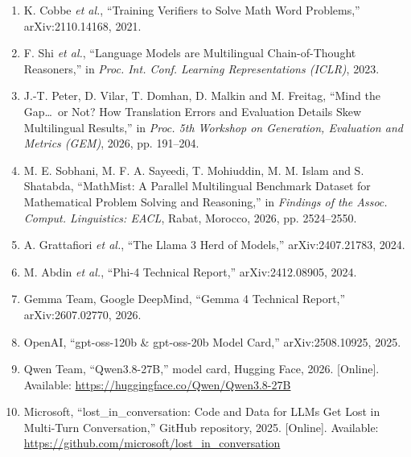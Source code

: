 \documentclass[11pt,a4paper]{article}
\begin{document}
\begin{enumerate}[label={\arabic*.},leftmargin=2em,itemsep=3pt,topsep=2pt]
\item K. Cobbe \textit{et al.}, ``Training Verifiers to Solve Math Word Problems,'' arXiv:2110.14168, 2021.
\item F. Shi \textit{et al.}, ``Language Models are Multilingual Chain-of-Thought Reasoners,'' in \textit{Proc. Int. Conf. Learning Representations (ICLR)}, 2023.
\item J.-T. Peter, D. Vilar, T. Domhan, D. Malkin and M. Freitag, ``Mind the Gap\ldots\ or Not? How Translation Errors and Evaluation Details Skew Multilingual Results,'' in \textit{Proc. 5th Workshop on Generation, Evaluation and Metrics (GEM)}, 2026, pp. 191--204.
\item M. E. Sobhani, M. F. A. Sayeedi, T. Mohiuddin, M. M. Islam and S. Shatabda, ``MathMist: A Parallel Multilingual Benchmark Dataset for Mathematical Problem Solving and Reasoning,'' in \textit{Findings of the Assoc. Comput. Linguistics: EACL}, Rabat, Morocco, 2026, pp. 2524--2550.
\item A. Grattafiori \textit{et al.}, ``The Llama 3 Herd of Models,'' arXiv:2407.21783, 2024.
\item M. Abdin \textit{et al.}, ``Phi-4 Technical Report,'' arXiv:2412.08905, 2024.
\item Gemma Team, Google DeepMind, ``Gemma 4 Technical Report,'' arXiv:2607.02770, 2026.
\item OpenAI, ``gpt-oss-120b \& gpt-oss-20b Model Card,'' arXiv:2508.10925, 2025.
\item Qwen Team, ``Qwen3.8-27B,'' model card, Hugging Face, 2026. [Online]. Available: \url{https://huggingface.co/Qwen/Qwen3.8-27B}
\item Microsoft, ``lost\_in\_conversation: Code and Data for LLMs Get Lost in Multi-Turn Conversation,'' GitHub repository, 2025. [Online]. Available: \url{https://github.com/microsoft/lost_in_conversation}
\end{enumerate}
\end{document}
